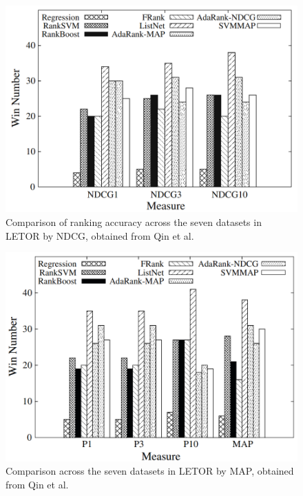 \begin{figure}[!h]
\includegraphics[scale=0.30]{gfx/ndcg_winning_number}
\caption{Comparison of ranking accuracy across the seven datasets in LETOR by \acs{NDCG}, obtained from Qin et al. \cite{Qin2010}}
\label{fig:ndcg_winning_number}
\end{figure}

\begin{figure}[!h]
\includegraphics[scale=0.30]{gfx/map_winning_number}
\caption{Comparison across the seven datasets in LETOR by \acs{MAP}, obtained from Qin et al. \cite{Qin2010}}
\label{fig:map_winning_number}
\end{figure}

